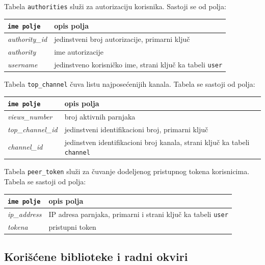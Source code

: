 \documentclass[12pt,oneside]{memoir}
\begin{document}
Tabela \texttt{authorities} služi za autorizaciju korisnika. Sastoji se od polja:

\begin{center}
\begin{tabular}{ |p{3.8cm}|p{10.2cm}| }
 \hline
 \texttt{ime polje} & opis polja \\ 
 \hline
 \textit{authority\_id} & jedinstveni broj autorizacije, primarni ključ \\ 
 \hline
 \textit{authority} & ime autorizacije \\  
 \hline
 \textit{username} & jedinstveno korisničko ime, strani ključ ka tabeli \texttt{user} \\
 \hline
\end{tabular}
\end{center}

Tabela \texttt{top\_channel} čuva listu najposećenijih kanala. Tabela se sastoji od polja:
 
\begin{center}
\begin{tabular}{ |p{3.8cm}|p{10.2cm}| }
 \hline
 \texttt{ime polje} & opis polja \\ 
 \hline
 \textit{views\_number} & broj aktivnih parnjaka \\ 
 \hline
 \textit{top\_channel\_id} & jedinstveni identifikacioni broj, primarni ključ \\  
 \hline
 \textit{channel\_id} & jedinstven identifikacioni broj kanala, strani ključ ka  tabeli \texttt{channel}  \\
 \hline
\end{tabular}
\end{center}


Tabela \texttt{peer\_token} služi za čuvanje dodeljenog pristupnog tokena korisnicima. Tabela se sastoji od polja: 

\begin{center}
\begin{tabular}{ |p{3.8cm}|p{10.2cm}| }
 \hline
 \texttt{ime polje} & opis polja \\ 
 \hline
 \textit{ip\_address} & IP adresa parnjaka, primarni i strani ključ ka tabeli  \texttt{user}\\ 
 \hline
 \textit{tokena} & pristupni token \\
 \hline
\end{tabular}
\end{center}


\subsection{Korišćene biblioteke i radni okviri}
\label{implementacija.1.2}
\end{document}
